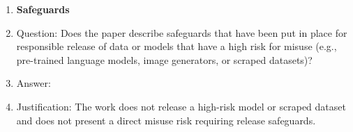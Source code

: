 \begin{enumerate}
\item {\bf Safeguards}
    \item[] Question: Does the paper describe safeguards that have been put in place for responsible release of data or models that have a high risk for misuse (e.g., pre-trained language models, image generators, or scraped datasets)?
    \item[] Answer: \answerNA{}
    \item[] Justification: The work does not release a high-risk model or
    scraped dataset and does not present a direct misuse risk requiring release safeguards.


\end{enumerate}
